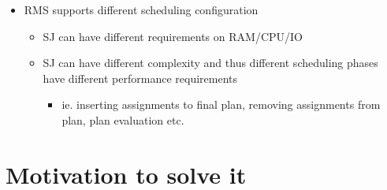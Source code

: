 \begin{itemize}
\begin{itemize}
    \end{itemize}
    \item RMS supports different scheduling configuration
    \begin{itemize}
        \item SJ can have different requirements on RAM/CPU/IO
        \item SJ can have different complexity and thus different scheduling phases have different performance requirements
        \begin{itemize}
            \item ie.
            inserting assignments to final plan, removing assignments from plan, plan evaluation etc.
        \end{itemize}
    \end{itemize}
\end{itemize}


\section{Motivation to solve it}\label{sec:motivation-to-solve-it}

